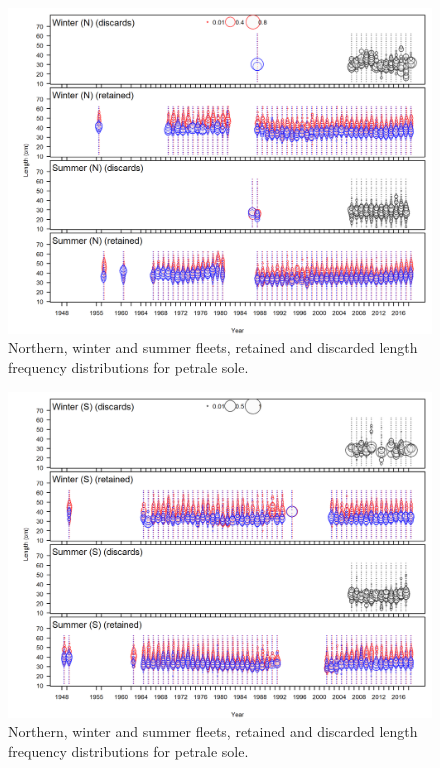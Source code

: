 \documentclass[12pt,]{article}
\begin{document}
\FloatBarrier

\begin{figure}
\centering
\includegraphics{r4ss/plots_mod1/comp_lendat__page1_multi-fleet_comparison.png}
\caption{Northern, winter and summer fleets, retained and discarded
length frequency distributions for petrale sole.
\label{fig:north_lengths}}
\end{figure}

\FloatBarrier

\begin{figure}
\centering
\includegraphics{r4ss/plots_mod1/comp_lendat__page2_multi-fleet_comparison.png}
\caption{Northern, winter and summer fleets, retained and discarded
length frequency distributions for petrale sole.
\label{fig:south_lengths}}
\end{figure}
\end{document}
